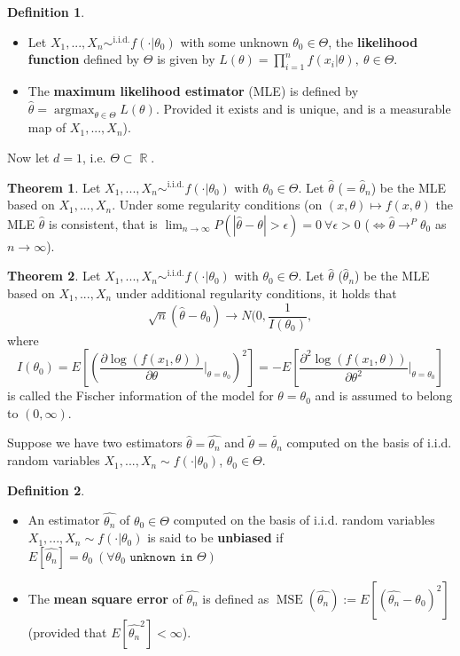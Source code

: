 \documentclass[11pt]{article}
\theoremstyle{definition}
\DeclareMathOperator{\iid}{i.i.d.}
\DeclareMathOperator{\R}{\mathbb{R}}
\DeclareMathOperator{\argmax}{argmax}
\DeclareMathOperator{\mse}{MSE}
\newtheorem{thm}{Theorem}
\newtheorem{defn}{Definition}
\begin{document}
\begin{defn}
\begin{itemize}
\item Let $X_1,...,X_n\sim^{\iid}f(\cdot|\theta_0)$ with some unknown $\theta_0\in\Theta$, the \textbf{likelihood function} defined by $\Theta$ is given by $L(\theta)=\prod^n_{i=1}f(x_i|\theta),\ \theta\in\Theta.$
\item The \textbf{maximum likelihood estimator} (MLE) is defined by $\hat{\theta}=\argmax_{\theta\in\Theta} L(\theta).$ Provided it exists and is unique, and is a measurable map of $X_1,...,X_n$).
\end{itemize}
\end{defn}

Now let $d=1$, i.e. $\Theta\subset\R$.

\begin{thm}Let $X_1,...,X_n\sim^{\iid}f(\cdot|\theta_0)$ with $\theta_0\in\Theta$. Let $\hat{\theta}$ ($=\hat{\theta}_n$) be the MLE based on $X_1,...,X_n.$ Under some regularity conditions (on $(x,\theta)\mapsto f(x,\theta)$ the MLE $\hat{\theta}$ is consistent, that is $\lim_{n\rightarrow\infty} P(|\hat{\theta}-\theta|>\epsilon)=0\ \forall \epsilon>0$ ($\iff\hat{\theta}\rightarrow^P\theta_0$ as $ n\rightarrow\infty$).
\end{thm}

\begin{thm}Let $X_1,...,X_n\sim^{\iid}f(\cdot|\theta_0)$ with $\theta_0\in\Theta$. Let $\hat{\theta}$ ($\hat{\theta}_n$) be the MLE based on $X_1,...,X_n$ under additional regularity conditions, it holds that
\[\sqrt{n}(\hat{\theta}- \theta_0)\rightarrow N(0,\frac{1}{I(\theta_0)},\]
where 
\[I(\theta_0)=E[(\frac{\partial\log(f(x_1,\theta))}{\partial\theta}|_{\theta=\theta_0})^2]=-E[\frac{\partial^2\log(f(x_1,\theta))}{\partial\theta^2}|_{\theta=\theta_0}] \]
is called the Fischer information of the model for $\theta=\theta_0$ and is assumed to belong to $(0,\infty)$.
\end{thm}

Suppose we have two estimators $\hat{\theta}=\hat{\theta_n}$ and $\tilde{\theta}=\tilde{\theta_n}$ computed on the basis of i.i.d. random variables $X_1,...,X_n\sim f(\cdot|\theta_0)$, $\theta_0\in\Theta$.

\begin{defn}
\begin{itemize}
\item An estimator $\hat{\theta_n}$ of $\theta_0\in\Theta$ computed on the basis of i.i.d. random variables $X_1,...,X_n\sim f(\cdot|\theta_0)$ is said to be \textbf{unbiased} if $E[\hat{\theta_n}]=\theta_0\ (\forall\theta_0\texttt{ unknown in }\Theta)$
\item The \textbf{mean square error} of $\hat{\theta_n}$ is defined as $\mse(\hat{\theta_n}):=E[(\hat{\theta_n}-\theta_0)^2]$ (provided that $E[\hat{\theta_n}^2]<\infty$).
\end{itemize}
\end{defn}
\end{document}
